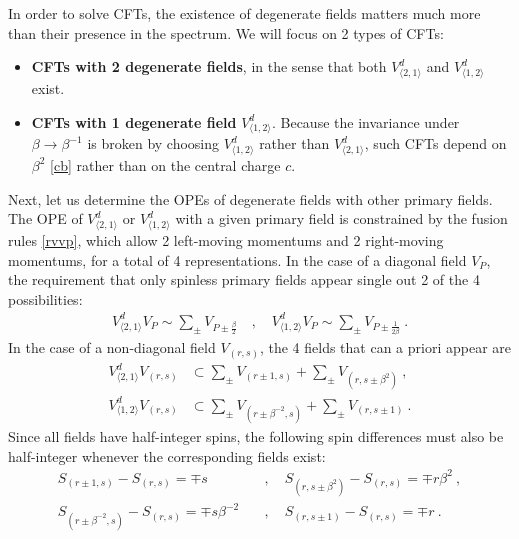 \documentclass[12pt, a4paper]{article}
\newcommand{\myindex}[1]{\textbf{\boldmath #1}}
\theoremstyle{break}
\begin{document}
In order to solve CFTs, the existence of degenerate fields matters much more than their presence in the spectrum. We will focus on 2 types of CFTs:
\begin{itemize}
 \item \myindex{CFTs with 2 degenerate fields}, in the sense that both $V^d_{\langle 2,1\rangle}$ and $V^d_{\langle 1,2\rangle}$ exist. 
 \item \myindex{CFTs with 1 degenerate field} $V^d_{\langle 1,2\rangle}$. Because the invariance under $\beta\to \beta^{-1}$ is broken by choosing $V^d_{\langle 1,2\rangle}$ rather than $V^d_{\langle 2,1\rangle}$, such CFTs depend on $\beta^2$ \eqref{cb} rather than on the central charge $c$. 
\end{itemize}
Next, let us determine the OPEs of degenerate fields with other primary fields.
The OPE of $V^d_{\langle 2,1\rangle}$ or $V^d_{\langle 1,2\rangle}$ with a given primary field is constrained by the fusion rules \eqref{rvvp}, which allow 2 left-moving momentums and 2 right-moving momentums, for a total of 4 representations.  In the case of a diagonal field $V_P$, the requirement that only spinless primary fields appear single out 2 of the 4 possibilities:
\begin{align}
 \boxed{V^d_{\langle 2,1\rangle} V_P \sim \sum_\pm V_{P\pm\frac{\beta}{2}}} \quad , \quad \boxed{V^d_{\langle 1,2\rangle} V_P \sim \sum_\pm V_{P\pm\frac{1}{2\beta}}} \ . 
 \label{vpope}
\end{align}
In the case of a non-diagonal field $V_{(r,s)}$, the 4 fields that can a priori appear are
\begin{subequations}
\begin{align}
 V^d_{\langle 2,1\rangle}V_{(r,s)} &\subset \sum_\pm V_{(r\pm 1,s)} + \sum_\pm V_{(r,s\pm \beta^2)}\ ,
 \label{vtovrs}
 \\
 V^d_{\langle 1,2\rangle}V_{(r,s)} &\subset \sum_\pm V_{(r\pm \beta^{-2},s)} + \sum_\pm V_{(r,s\pm 1)}\ .
 \label{votvrs}
\end{align}
\end{subequations}
Since all fields have half-integer spins, the following spin differences must also be half-integer whenever the corresponding fields exist: 
\begin{subequations}
\begin{align}
 S_{(r\pm 1,s)} - S_{(r,s)} = \mp s &\quad , \quad S_{(r,s\pm \beta^2)} - S_{(r,s)} = \mp r\beta^2\ ,
 \label{sdiff1}
 \\
 S_{(r\pm \beta^{-2},s)} - S_{(r,s)} = \mp s\beta^{-2} &\quad , \quad S_{(r,s\pm 1)} - S_{(r,s)} = \mp r\ . 
 \label{sdiff2}
\end{align}
\end{subequations}
\end{document}

